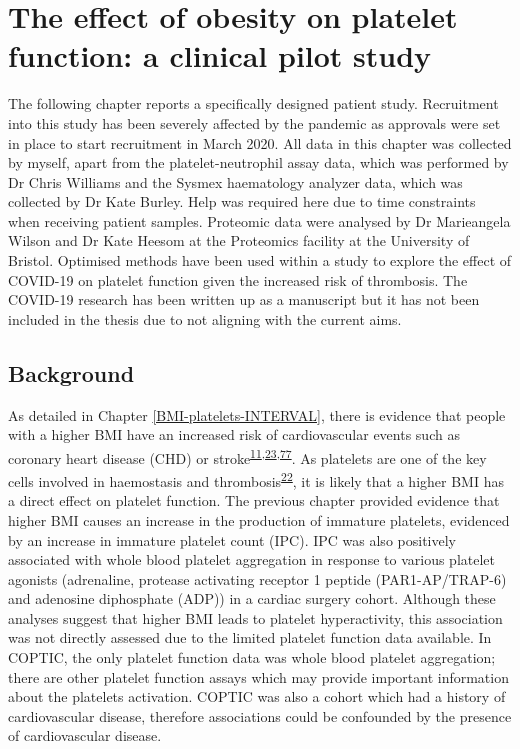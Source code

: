 \documentclass[11pt,twoside]{bristolthesis}
\begin{document}
\hypertarget{BMI-platelets-clinic}{%
\chapter{The effect of obesity on platelet function: a clinical pilot study}\label{BMI-platelets-clinic}}

The following chapter reports a specifically designed patient study. Recruitment into this study has been severely affected by the pandemic as approvals were set in place to start recruitment in March 2020. All data in this chapter was collected by myself, apart from the platelet-neutrophil assay data, which was performed by Dr Chris Williams and the Sysmex haematology analyzer data, which was collected by Dr Kate Burley. Help was required here due to time constraints when receiving patient samples. Proteomic data were analysed by Dr Marieangela Wilson and Dr Kate Heesom at the Proteomics facility at the University of Bristol. Optimised methods have been used within a study to explore the effect of COVID-19 on platelet function given the increased risk of thrombosis. The COVID-19 research has been written up as a manuscript but it has not been included in the thesis due to not aligning with the current aims.

\hypertarget{background-2}{%
\section{Background}\label{background-2}}

As detailed in Chapter \ref{BMI-platelets-INTERVAL}, there is evidence that people with a higher BMI have an increased risk of cardiovascular events such as coronary heart disease (CHD) or stroke\textsuperscript{\protect\hyperlink{ref-Nordestgaard2012}{11},\protect\hyperlink{ref-Dale2017}{23},\protect\hyperlink{ref-Wolk2003a}{77}}. As platelets are one of the key cells involved in haemostasis and thrombosis\textsuperscript{\protect\hyperlink{ref-Koupenova2017a}{22}}, it is likely that a higher BMI has a direct effect on platelet function. The previous chapter provided evidence that higher BMI causes an increase in the production of immature platelets, evidenced by an increase in immature platelet count (IPC). IPC was also positively associated with whole blood platelet aggregation in response to various platelet agonists (adrenaline, protease activating receptor 1 peptide (PAR1-AP/TRAP-6) and adenosine diphosphate (ADP)) in a cardiac surgery cohort. Although these analyses suggest that higher BMI leads to platelet hyperactivity, this association was not directly assessed due to the limited platelet function data available. In COPTIC, the only platelet function data was whole blood platelet aggregation; there are other platelet function assays which may provide important information about the platelets activation. COPTIC was also a cohort which had a history of cardiovascular disease, therefore associations could be confounded by the presence of cardiovascular disease.
\end{document}
